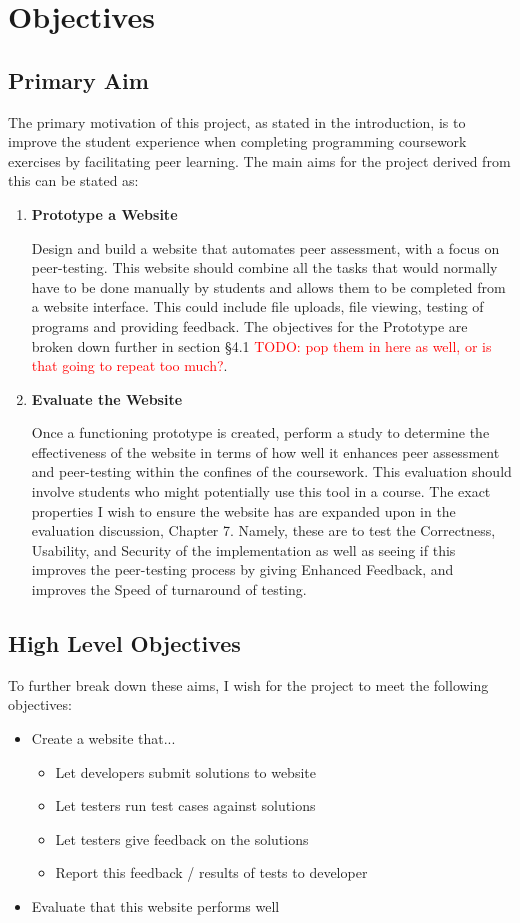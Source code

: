\documentclass[a4paper,11pt]{report}
\newcommand{\todo}[1]{\textcolor{red}{TODO: #1}}
\begin{document}
\chapter{Objectives}
\section{Primary Aim}
The primary motivation of this project, as stated in the introduction, is to improve the student experience when completing programming coursework exercises by facilitating peer learning. The main aims for the project derived from this can be stated as:
\begin{enumerate}
\item \textbf{Prototype a Website}\par
Design and build a website that automates peer assessment, with a focus on peer-testing. This website should combine all the tasks that would normally have to be done manually by students and allows them to be completed from a website interface. This could include file uploads, file viewing, testing of programs and providing feedback. The objectives for the Prototype are broken down further in section \S4.1 \todo{pop them in here as well, or is that going to repeat too much?}.
\item \textbf{Evaluate the Website}\par
\label{sec:aimeval}
Once a functioning prototype is created, perform a study to determine the effectiveness of the website in terms of how well it enhances peer assessment and peer-testing within the confines of the coursework. This evaluation should involve students who might potentially use this tool in a course. The exact properties I wish to ensure the website has are expanded upon in the evaluation discussion, Chapter 7. Namely, these are to test the Correctness, Usability, and Security of the implementation as well as seeing if this improves the peer-testing process by giving Enhanced Feedback, and improves the Speed of turnaround of testing.
\end{enumerate}

\section{High Level Objectives}
To further break down these aims, I wish for the project to meet the following objectives:
\begin{itemize}
\item Create a website that...
\begin{itemize}
\item Let developers submit solutions to website
\item Let testers run test cases against solutions
\item Let testers give feedback on the solutions
\item Report this feedback / results of tests to developer
\end{itemize}
\item Evaluate that this website performs well
\end{itemize}
\end{document}
